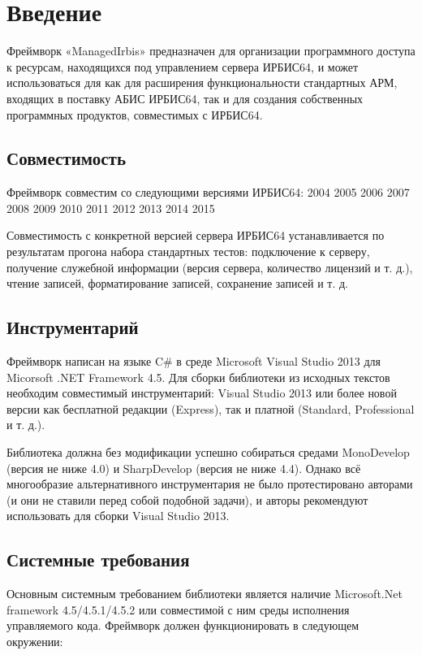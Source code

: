 \chapter*{Введение}

Фреймворк «ManagedIrbis» предназначен для организации программного доступа к ресурсам, находящихся под управлением сервера ИРБИС64, и может использоваться для как для расширения функциональности стандартных АРМ, входящих в поставку АБИС ИРБИС64, так и для создания собственных программных продуктов, совместимых с ИРБИС64.

\section*{Совместимость}

Фреймворк совместим со следующими версиями ИРБИС64:
2004	2005	2006	2007	2008	2009	2010	2011	2012	2013	2014	2015

Совместимость с конкретной версией сервера ИРБИС64 устанавливается по результатам прогона набора стандартных тестов: подключение к серверу, получение служебной информации (версия сервера, количество лицензий и т. д.), чтение записей, форматирование записей, сохранение записей и т. д.

\section*{Инструментарий}

Фреймворк написан на языке C\# в среде Microsoft Visual Studio 2013 для Micorsoft .NET Framework 4.5. Для сборки библиотеки из исходных текстов необходим совместимый инструментарий: Visual Studio 2013 или более новой версии как бесплатной редакции (Express), так и платной (Standard, Profes\-sional и т. д.).

Библиотека должна без модификации успешно собираться средами Mono\-Develop (версия не ниже 4.0) и Sharp\-Develop (версия не ниже 4.4).
Однако всё многообразие альтернативного инструментария не было протестировано авторами (и они не ставили перед собой подобной задачи), и авторы рекомендуют использовать для сборки Visual Studio 2013.

\section*{Системные требования}

Основным системным требованием библиотеки является наличие Microsoft.Net framework 4.5/4.5.1/4.5.2 или совместимой с ним среды исполнения управляемого кода.
Фреймворк должен функционировать в следующем окружении:

